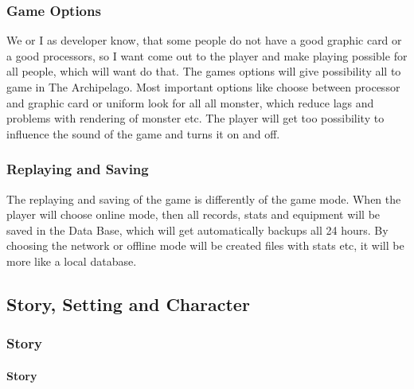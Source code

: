 \documentclass[parskip=full]{scrartcl}
\begin{document}
				\subsubsection{Game Options} \vspace{-5mm}
					\par \begingroup
					\leftskip=2cm
					\noindent
							We or I as developer know, that some people do not have a good graphic card or a good processors, so I want come out to the player and make playing possible for all people, which will want do that. The games options will give possibility all to game in The Archipelago. Most important options like choose between processor and graphic card or uniform look for all all monster, which reduce lags and problems with rendering of monster etc. The player will get too possibility to influence the sound of the game and turns it on and off.
					\par \endgroup
				\subsubsection{Replaying and Saving} \vspace{-5mm}
					\par \begingroup
					\leftskip=2cm
					\noindent
							The replaying and saving of the game is differently of the game mode. When the player will choose online mode, then all records, stats and equipment will be saved in the Data Base, which will get automatically backups all 24 hours. By choosing the network or offline mode will be created files with stats etc, it will be more like a local database.
					\par \endgroup
			\subsection{Story, Setting and Character} \vspace{-5mm}
				\subsubsection{Story} \vspace{-5mm}
					\paragraph{Story} \vspace{-0.5cm}
						\par \begingroup
						\leftskip=2cm
						\noindent
								
						\par \endgroup
\end{document}

